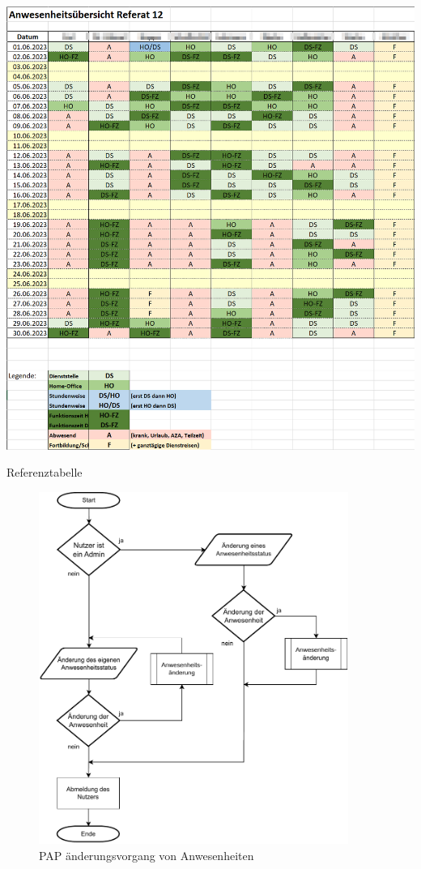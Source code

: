 \begin{table}[htb]
    \centering
    \includegraphics[page=1,height=1\textwidth]{anhang/abb/Tabelle.png}
    \caption[Beschreibung]{Referenztabelle}
    \label{abb:Ausgangstabelle}
\end{table}


\begin{figure}[htb]
    \centering
    \includegraphics[width=0.9\textwidth,angle=0]{anhang/abb/PAP_Kurz.pdf}
    \caption[Beschreibung]{PAP änderungsvorgang von Anwesenheiten}
    \label{abb:PAP}
\end{figure}

